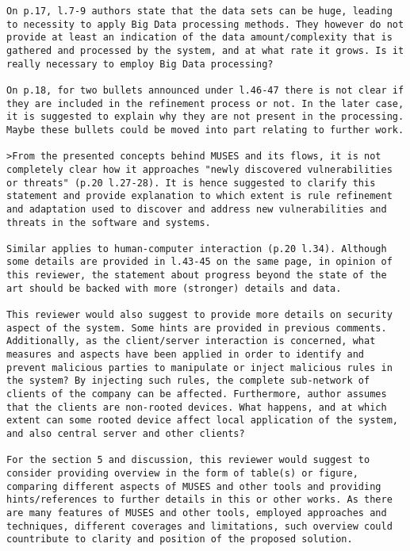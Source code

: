 \documentclass[preprint]{elsarticle}
\begin{document}
\begin{verbatim}
On p.17, l.7-9 authors state that the data sets can be huge, leading to necessity to apply Big Data processing methods. They however do not provide at least an indication of the data amount/complexity that is gathered and processed by the system, and at what rate it grows. Is it really necessary to employ Big Data processing?

On p.18, for two bullets announced under l.46-47 there is not clear if they are included in the refinement process or not. In the later case, it is suggested to explain why they are not present in the processing. Maybe these bullets could be moved into part relating to further work.

>From the presented concepts behind MUSES and its flows, it is not completely clear how it approaches "newly discovered vulnerabilities or threats" (p.20 l.27-28). It is hence suggested to clarify this statement and provide explanation to which extent is rule refinement and adaptation used to discover and address new vulnerabilities and threats in the software and systems.

Similar applies to human-computer interaction (p.20 l.34). Although some details are provided in l.43-45 on the same page, in opinion of this reviewer, the statement about progress beyond the state of the art should be backed with more (stronger) details and data.

This reviewer would also suggest to provide more details on security aspect of the system. Some hints are provided in previous comments. Additionally, as the client/server interaction is concerned, what measures and aspects have been applied in order to identify and prevent malicious parties to manipulate or inject malicious rules in the system? By injecting such rules, the complete sub-network of clients of the company can be affected. Furthermore, author assumes that the clients are non-rooted devices. What happens, and at which extent can some rooted device affect local application of the system, and also central server and other clients?

For the section 5 and discussion, this reviewer would suggest to consider providing overview in the form of table(s) or figure, comparing different aspects of MUSES and other tools and providing hints/references to further details in this or other works. As there are many features of MUSES and other tools, employed approaches and techniques, different coverages and limitations, such overview could countribute to clarity and position of the proposed solution.


\end{verbatim}
\end{document}
